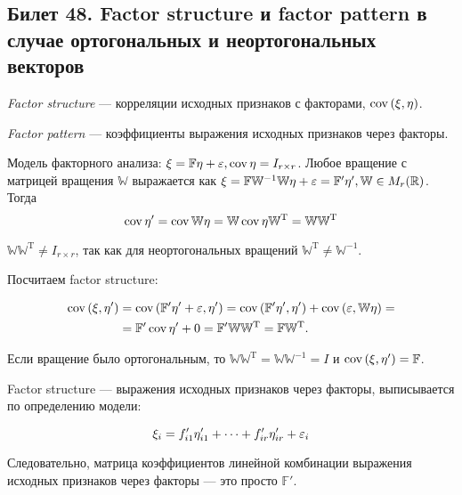 \subsection{Билет 48. Factor structure и factor pattern в случае ортогональных и неортогональных векторов}
	\begin{dfn}
		\emph{Factor structure} --- корреляции исходных признаков с факторами, $\operatorname{cov}{\left(\xi, \eta\right)}$.
	\end{dfn}
	\begin{dfn}
		\emph{Factor pattern} --- коэффициенты выражения исходных признаков через факторы.
	\end{dfn}

	Модель факторного анализа: $\xi = \mathbb F \eta + \varepsilon, \operatorname{cov}{\eta} = I_{r\times r}$. Любое вращение с матрицей вращения $\mathbb W$ выражается как $\xi = \mathbb F \mathbb W^{-1} \mathbb W \eta + \varepsilon = \mathbb F' \eta', \mathbb W \in M_r(\mathbb{R})$. Тогда
	$$\operatorname{cov}{\eta'} = \operatorname{cov}{\mathbb W \eta} = \mathbb W \operatorname{cov}{\eta} \mathbb W^\mathrm T = \mathbb W \mathbb W^\mathrm T $$

	$\mathbb W \mathbb W^\mathrm T \neq I_{r\times r}$, так как для неортогональных вращений $\mathbb W^\mathrm T \not = \mathbb W^{-1}$.

	Посчитаем factor structure:

	\begin{align*}
		\operatorname{cov}{\left(\xi,\eta'\right)} &= \operatorname{cov}{\left(\mathbb F' \eta' + \varepsilon, \eta'\right)} = \operatorname{cov}{\left(\mathbb F' \eta', \eta'\right)} + \operatorname{cov}{\left(\varepsilon, \mathbb W \eta\right)} =\\
		&= \mathbb F' \operatorname{cov}{\eta'} + 0 = \mathbb F' \mathbb W \mathbb W^\mathrm T = \mathbb F \mathbb W^\mathrm T.
	\end{align*}

	Если вращение было ортогональным, то $\mathbb W \mathbb W^\mathrm T = \mathbb W \mathbb W^{-1} = I$ и $\operatorname{cov}{\left(\xi,\eta'\right)} = \mathbb F$.

	Factor structure --- выражения исходных признаков через факторы, выписывается по определению модели:

	$$\xi_i = f_{i1}'\eta_{i1}' + \cdots + f_{ir}'\eta_{ir}' + \varepsilon_i$$

	Следовательно, матрица коэффициентов линейной комбинации выражения исходных признаков через факторы --- это просто $\mathbb F'$.


